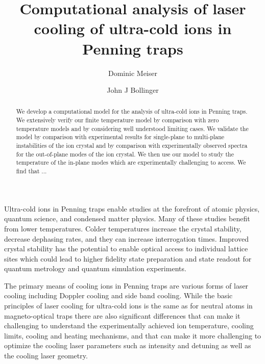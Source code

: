 \documentclass[aps, pra, preprint]{revtex4-1}
\begin{document}
\title{Computational analysis of laser cooling of ultra-cold ions
  in Penning traps
}

\author{Dominic Meiser}
\author{John J Bollinger}

\begin{abstract}
  We develop a computational model for the analysis of ultra-cold
  ions in Penning traps. We extensively verify our finite
  temperature model by comparison with zero temperature models
  and by considering well understood limiting cases. We validate
  the model by comparison with experimental results for
  single-plane to multi-plane instabilities of the ion crystal
  and by comparison with experimentally observed spectra for the
  out-of-plane modes of the ion crystal.
  We then use our model to study the temperature of the in-plane
  modes which are experimentally challenging to access. We find
  that ...
\end{abstract}

\maketitle


Ultra-cold ions in Penning traps enable studies at the forefront
of atomic physics, quantum
science, and condensed matter
physics. Many of these studies benefit from
lower temperatures. Colder temperatures increase the crystal
stability, decrease dephasing rates, and they can increase
interrogation times. Improved crystal stability has the potential
to enable optical access to individual lattice sites which could
lead to higher fidelity state preparation and state readout for quantum
metrology and quantum simulation
experiments.

The primary means of cooling ions in Penning traps are various
forms of laser cooling including Doppler cooling and side band
cooling. While the basic principles of laser cooling for
ultra-cold ions is the same as for neutral atoms in
magneto-optical traps there are also significant differences that
can make it challenging to understand the experimentally achieved
ion temperature, cooling limits, cooling and heating mechanisms,
and that can make it more challenging to optimize the cooling
laser parameters such as intensity and detuning as well as the
cooling laser geometry.
\end{document}
